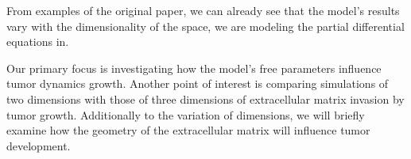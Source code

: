 From examples of the original paper, we can already see that the model's results vary with the dimensionality of the space, we are modeling the partial differential equations in. 

Our primary focus is investigating how the model's free parameters influence tumor dynamics growth. Another point of interest is comparing simulations of two dimensions with those of three dimensions of extracellular matrix invasion by tumor growth. Additionally to the variation of dimensions, we will briefly examine how the geometry of the extracellular matrix will influence tumor development.